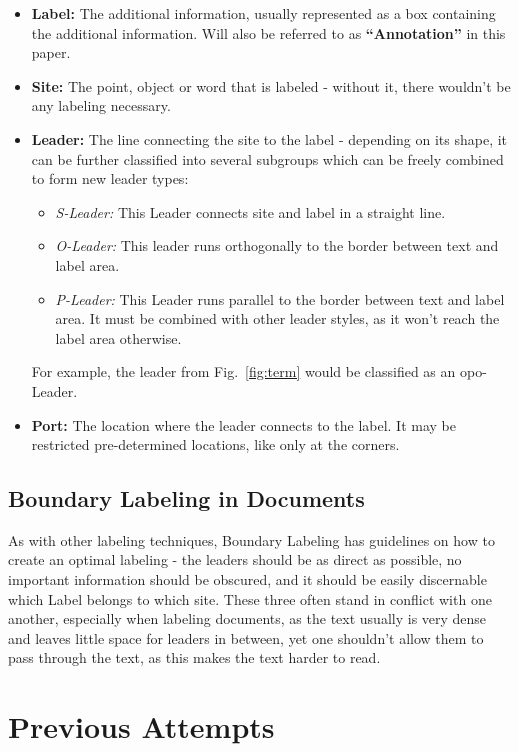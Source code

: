 \documentclass[11pt,a4paper]{article}
\begin{document}
\begin{itemize}
 \item \textbf{Label:} The additional information, usually represented as a box containing the additional information. Will also be referred to as \textbf{``Annotation''} in this paper.
 \item \textbf{Site:} The point, object or word that is labeled - without it, there wouldn't be any labeling necessary.
 \item \textbf{Leader:} The line connecting the site to the label - depending on its shape, it can be further classified into several subgroups which can be freely combined to form new leader types:
  \begin{itemize}
   \item \textit{S-Leader:} This Leader connects site and label in a straight line.
   \item \textit{O-Leader:} This leader runs orthogonally to the border between text and label area.
   \item \textit{P-Leader:} This Leader runs parallel to the border between text and label area. It must be combined with other leader styles, as it won't reach the label area otherwise.
  \end{itemize}
    For example, the leader from Fig.~\ref{fig:term} would be classified as an opo-Leader.
 \item \textbf{Port:} The location where the leader connects to the label. It may be restricted pre-determined locations, like only at the corners.
\end{itemize}

\newpage

\subsection{Boundary Labeling in Documents}
As with other labeling techniques, Boundary Labeling has guidelines on how to create an optimal labeling - the leaders should be as direct as possible, no important information should be obscured, and it should be easily discernable which Label belongs to which site. These three often stand in conflict with one another, especially when labeling documents, as the text usually is very dense and leaves little space for leaders in between, yet one shouldn't allow them to pass through the text, as this makes the text harder to read.

\section{Previous Attempts}%
\end{document}

